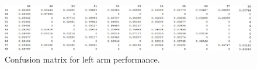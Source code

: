 \documentclass{sig-alternate}
\begin{document}





\begin{figure}[bp]
\centering
\includegraphics[width=1.0\linewidth]{visual_results/nConfkNN_left.jpg}
\caption{Confusion matrix for left arm performance.}
\label{fig:conf_left}
\end{figure}
\end{document}
